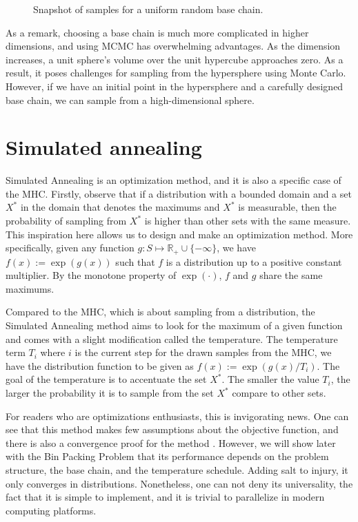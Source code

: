 \documentclass[]{article}
\theoremstyle{definition}
\begin{document}
\begin{figure}[H]
\begin{subfigure}{0.3\textwidth}
            \end{subfigure}
            \caption{Snapshot of samples for a uniform random base chain.}
            \label{fig:unif_rand_bc}
        \end{figure}
        As a remark, choosing a base chain is much more complicated in higher dimensions, and using MCMC has overwhelming advantages. As the dimension increases, a unit sphere's volume over the unit hypercube approaches zero. As a result, it poses challenges for sampling from the hypersphere using Monte Carlo. However, if we have an initial point in the hypersphere and a carefully designed base chain, we can sample from a high-dimensional sphere. 

\section{Simulated annealing}
    Simulated Annealing is an optimization method, and it is also a specific case of the MHC. Firstly, observe that if a distribution with a bounded domain and a set $X^*$ in the domain that denotes the maximums and $X^*$ is measurable, then the probability of sampling from $X^*$ is higher than other sets with the same measure. This inspiration here allows us to design and make an optimization method. More specifically, given any function $g:S \mapsto \mathbb R_+ \cup \{-\infty\}$, we have $f(x):= \exp(g(x))$ such that $f$ is a distribution up to a positive constant multiplier. By the monotone property of $\exp(\cdot)$, $f$ and $g$ share the same maximums. 
    \par
    Compared to the MHC, which is about sampling from a distribution, the Simulated Annealing method aims to look for the maximum of a given function and comes with a slight modification called the temperature. The temperature term $T_i$ where $i$ is the current step for the drawn samples from the MHC, we have the distribution function to be given as $f(x):= \exp(g(x)/T_i)$. The goal of the temperature is to accentuate the set $X^*$. The smaller the value $T_i$, the larger the probability it is to sample from the set $X^*$ compare to other sets. 
    \par
    For readers who are optimizations enthusiasts, this is invigorating news. One can see that this method makes few assumptions about the objective function, and there is also a convergence proof for the method \cite{article:sim_anneal_1994}. However, we will show later with the Bin Packing Problem that its performance depends on the problem structure, the base chain, and the temperature schedule. Adding salt to injury, it only converges in distributions. Nonetheless, one can not deny its universality, the fact that it is simple to implement, and it is trivial to parallelize in modern computing platforms. 
\end{document}
